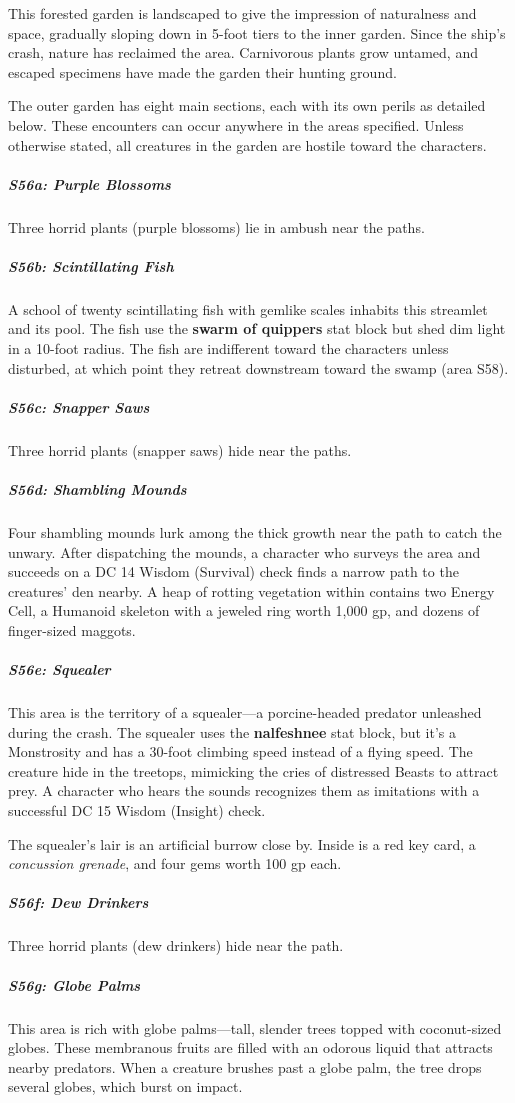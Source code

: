 \documentclass[10pt,a4paper,twoside,bg=print,twocolumn,openany,nodeprecatedcode]{dndbook}
\begin{document}
This forested garden is landscaped to give the impression of naturalness and space, gradually sloping down in 5-foot tiers to the inner garden. Since the ship's crash, nature has reclaimed the area. Carnivorous plants grow untamed, and escaped specimens have made the garden their hunting ground.

The outer garden has eight main sections, each with its own perils as detailed below. These encounters can occur anywhere in the areas specified. Unless otherwise stated, all creatures in the garden are hostile toward the characters.

\subparagraph{S56a: Purple Blossoms}
Three horrid plants (purple blossoms) lie in ambush near the paths.

\subparagraph{S56b: Scintillating Fish}
A school of twenty scintillating fish with gemlike scales inhabits this streamlet and its pool. The fish use the \textbf{swarm of quippers} stat block but shed dim light in a 10-foot radius. The fish are indifferent toward the characters unless disturbed, at which point they retreat downstream toward the swamp (area S58).

\subparagraph{S56c: Snapper Saws}
Three horrid plants (snapper saws) hide near the paths.

\subparagraph{S56d: Shambling Mounds}
Four shambling mounds lurk among the thick growth near the path to catch the unwary. After dispatching the mounds, a character who surveys the area and succeeds on a DC 14 Wisdom (Survival) check finds a narrow path to the creatures' den nearby. A heap of rotting vegetation within contains two Energy Cell, a Humanoid skeleton with a jeweled ring worth 1,000 gp, and dozens of finger-sized maggots.

\subparagraph{S56e: Squealer}
This area is the territory of a squealer—a porcine-headed predator unleashed during the crash. The squealer uses the \textbf{nalfeshnee} stat block, but it's a Monstrosity and has a 30-foot climbing speed instead of a flying speed. The creature hide in the treetops, mimicking the cries of distressed Beasts to attract prey. A character who hears the sounds recognizes them as imitations with a successful DC 15 Wisdom (Insight) check.

The squealer's lair is an artificial burrow close by. Inside is a red key card, a \textit{concussion grenade}, and four gems worth 100 gp each.

\subparagraph{S56f: Dew Drinkers}
Three horrid plants (dew drinkers) hide near the path.

\subparagraph{S56g: Globe Palms}
This area is rich with globe palms—tall, slender trees topped with coconut-sized globes. These membranous fruits are filled with an odorous liquid that attracts nearby predators. When a creature brushes past a globe palm, the tree drops several globes, which burst on impact.
\end{document}
